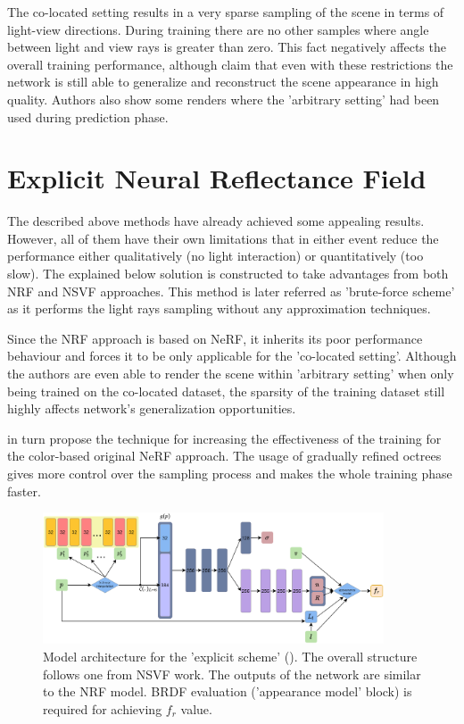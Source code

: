 The co-located setting results in a very sparse sampling of the scene in terms of light-view directions.
During training there are no other samples
where angle between light and view rays is greater than zero.
This fact negatively affects the overall training performance,
although \cite{bi2020neural} claim
that even with these restrictions
the network is still able to generalize and reconstruct the scene appearance in high quality.
Authors also show some renders where the 'arbitrary setting' had been used during prediction phase.





\section{Explicit Neural Reflectance Field}
\label{sec:explicit_scheme}

The described above methods have already achieved some appealing results.
However, all of them have their own limitations that in either event reduce the performance either qualitatively (no light interaction) or quantitatively (too slow).
The explained below solution is constructed to take advantages from both NRF and NSVF approaches.
This method is later referred as 'brute-force scheme' as it performs the light rays sampling without any approximation techniques.

Since the NRF approach \cite{bi2020neural} is based on NeRF, it inherits its poor performance behaviour
and forces it to be only applicable for the 'co-located setting'.
Although the authors are even able to render the scene within 'arbitrary setting'
when only being trained on the co-located dataset,
the sparsity of the training dataset still highly affects network's generalization opportunities.

\cite{liu2021neural} in turn propose the technique for increasing the effectiveness of the training
for the color-based original NeRF approach.
The usage of gradually refined octrees gives more control over the sampling process
and makes the whole training phase faster.

\begin{figure}[!htb]
    \centering
    \includegraphics[width=0.9\textwidth]{figures/explicit_scheme.png}
    \caption{Model architecture for the 'explicit scheme'
    ().
The overall structure follows one from NSVF work.
The outputs of the network are similar to the NRF model.
BRDF evaluation ('appearance model' block) is required for achieving $f_r$ value.
    }
    \label{fig:mlnrf_bfex}
\end{figure}

